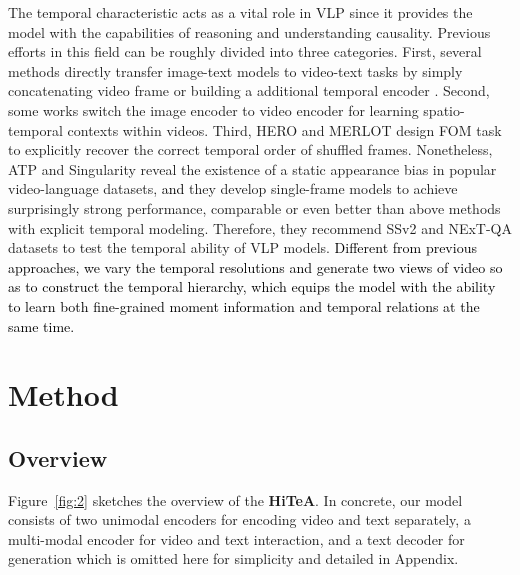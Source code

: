 \documentclass[10pt,twocolumn,letterpaper]{article}
\newcommand{\modelname}{\textbf{HiTeA}\xspace}
\def\revised{\textcolor{black}}
\begin{document}
The temporal characteristic acts as a vital role in VLP since it provides the model with the capabilities of reasoning and understanding causality. Previous efforts in this field can be roughly divided into three categories. First, several methods directly transfer image-text models to video-text tasks by simply concatenating video frame \cite{li2022blip,li2022mplug} or building a additional temporal encoder \cite{luo2022clip4clip,ma2022xclip}. Second, some works \cite{bain2021frozen,li2022alpro,fu2021violet,li2022lavender} switch the image encoder to video encoder for learning spatio-temporal contexts within videos. Third, HERO \cite{li2020hero} and MERLOT \cite{zellers2021merlot} design FOM task to explicitly recover the correct temporal order of shuffled frames. Nonetheless, ATP \cite{buch2022atp} and Singularity \cite{lei2022singularity} reveal the existence of a static appearance bias in popular video-language datasets, \revised{and} they develop single-frame models to achieve surprisingly strong performance, comparable or even better than above methods with explicit temporal modeling. Therefore, they recommend SSv2 \cite{lei2022singularity} and NExT-QA \cite{xiao2021nextqa} datasets to test the temporal ability of VLP models. 
\revised{Different from previous approaches, we vary the temporal resolutions and generate two views of video so as to construct the temporal hierarchy, which equips the model with the ability to learn both fine-grained moment information and temporal relations at the same time.}


\section{Method}

\subsection{Overview}
\label{sec:overview}

Figure~\ref{fig:2} sketches the overview of the \modelname. In concrete, our model consists of two unimodal encoders for encoding video and text separately, a multi-modal encoder for video and text interaction, and a text decoder for generation which is omitted here for simplicity and detailed in Appendix. 
\end{document}
